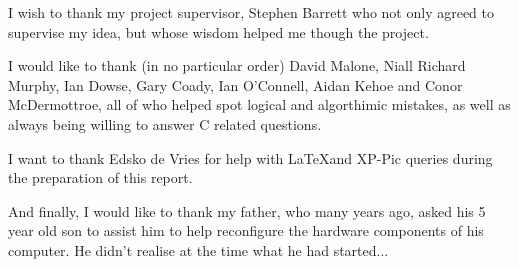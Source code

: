 
I wish to thank my project supervisor, Stephen Barrett who not only
agreed to supervise my idea, but whose wisdom helped me though the
project.


I would like to thank (in no particular order) David Malone, Niall 
Richard Murphy, Ian Dowse, Gary Coady, Ian O'Connell, Aidan Kehoe and 
Conor McDermottroe, all of who helped spot logical and algorthimic 
mistakes, as well as always being willing to answer C related questions.


I want to thank Edsko de Vries for help with \LaTeX and XP-Pic queries
during the preparation of this report.



And finally, I would like to thank my father, who many years ago, asked
his 5 year old son to assist him to help reconfigure the hardware 
components of his computer. He didn't realise at the time what he had 
started...
